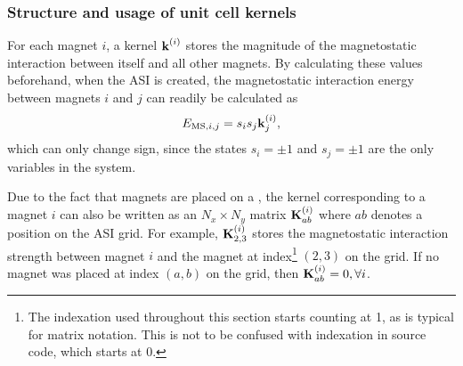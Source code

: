 \subsubsection{Structure and usage of unit cell kernels}\label{sec:2:Kernels:Structure}
For each magnet $i$, a kernel $\boldsymbol{\mathbf{k}}^{(i)}$ stores the magnitude of the magnetostatic interaction between itself and all other magnets.
By calculating these values beforehand, when the ASI is created, the magnetostatic interaction energy between magnets $i$ and $j$ can readily be calculated as
\begin{equation}
	\label{eq:2:Kernel_k}
	E_{\mathrm{MS},i,j}= s_i s_j \boldsymbol{\mathbf{k}}^{(i)}_j \mathrm{,}
\end{equation}
which can only change sign, since the states $s_i = \pm 1$ and $s_j = \pm 1$ are the only variables in the system. \par
Due to the fact that magnets are placed on a , the kernel corresponding to a magnet $i$ can also be written as an $N_x \times N_y$ matrix $\boldsymbol{\mathbf{K}}^{(i)}_{ab}$ where $ab$ denotes a position on the ASI grid.
For example, $\boldsymbol{\mathbf{K}}^{(i)}_{2,3}$ stores the magnetostatic interaction strength between magnet $i$ and the magnet at index\footnote{
	The indexation used throughout this section starts counting at 1, as is typical for matrix notation.
	This is not to be confused with indexation in source code, which starts at 0.
} $(2,3)$ on the grid.
If no magnet was placed at index $(a,b)$ on the grid, then $\boldsymbol{\mathbf{K}}^{(i)}_{ab} = 0, \forall i$. \\\par

